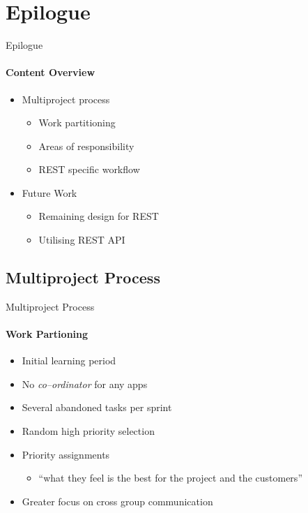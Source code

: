 \section{Epilogue}
    \begin{frame}[t]{Epilogue}\framesubtitle{Content Overview}
        \begin{itemize}
            \item Multiproject process
            \begin{itemize}
                \item Work partitioning
                \item Areas of responsibility
                \item REST specific workflow
            \end{itemize}
            \item Future Work
            \begin{itemize}
                \item Remaining design for REST
                \item Utilising REST API
            \end{itemize}
        \end{itemize}
    \end{frame}

    \subsection{Multiproject Process}
    \begin{frame}[t]{Multiproject Process}\framesubtitle{Work Partioning}  
        \begin{itemize}
            \item Initial learning period
            \item No \textit{co--ordinator} for any apps
            \item Several abandoned tasks per sprint
            \item Random high priority selection
            \item Priority assignments
            \begin{itemize}
                \item ``what they feel is the best for the project and the customers''
            \end{itemize}
            \item Greater focus on cross group communication
        \end{itemize}
    \end{frame}

